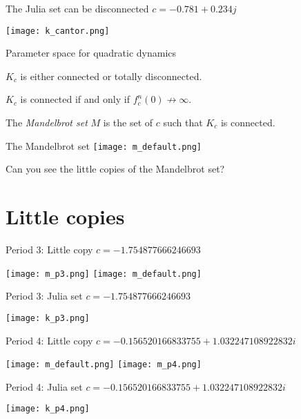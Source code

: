 \documentclass{beamer}
\begin{document}
\begin{frame}{The Julia set can be disconnected}
\centering
$c=-0.781+0.234j$

\texttt{[image: k\_cantor.png]}
\end{frame}

\begin{frame}{Parameter space for quadratic dynamics}
\begin{theorem}
$K_c$ is either connected or totally disconnected.
\end{theorem}
\begin{theorem}
$K_c$ is connected if and only if $f_c^n(0)\not\rightarrow\infty$.
\end{theorem}
\begin{definition}
The \emph{Mandelbrot set} $M$ is the set of $c$ such that $K_c$ is connected.
\end{definition}
\end{frame}

\begin{frame}{The Mandelbrot set}
\centering
\texttt{[image: m\_default.png]}

Can you see the little copies of the Mandelbrot set?
\end{frame}

\section{Little copies}

\begin{frame}{Period 3: Little copy}
\centering
$c=-1.754877666246693$

\texttt{[image: m\_p3.png]}
\texttt{[image: m\_default.png]}
\end{frame}

\begin{frame}{Period 3: Julia set}
\centering
$c=-1.754877666246693$

\texttt{[image: k\_p3.png]}
\end{frame}

\begin{frame}{Period 4: Little copy}
\centering
$c=-0.156520166833755+1.032247108922832i$

\texttt{[image: m\_default.png]}
\texttt{[image: m\_p4.png]}
\end{frame}

\begin{frame}{Period 4: Julia set}
\centering
$c=-0.156520166833755+1.032247108922832i$

\texttt{[image: k\_p4.png]}
\end{frame}
\end{document}
